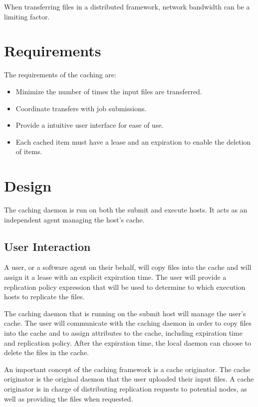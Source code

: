 When transferring files in a distributed framework, network bandwidth can be a limiting factor. 


\section{Requirements}

The requirements of the caching are:
\begin{itemize}
\item Minimize the number of times the input files are transferred.
\item Coordinate transfers with job submissions.
\item Provide a intuitive user interface for ease of use.
\item Each cached item must have a lease and an expiration to enable the deletion of items.
\end{itemize}

\section{Design}

The caching daemon is run on both the submit and execute hosts.  It acts as an independent agent managing the host's cache.



\subsection{User Interaction}

A user, or a software agent on their behalf, will copy files into the cache and will assign it a lease with an explicit expiration time.  The user will provide a replication policy expression that will be used to determine to which execution hosts to replicate the files.

The caching daemon that is running on the submit host will manage the user's cache.  The user will communicate with the caching daemon in order to copy files into the cache and to assign attributes to the cache, including expiration time and replication policy.  After the expiration time, the local daemon can choose to delete the files in the cache.

An important concept of the caching framework is a cache originator.  The cache originator is the original daemon that the user uploaded their input files.  A cache originator is in charge of distributing replication requests to potential nodes, as well as providing the files when requested.

